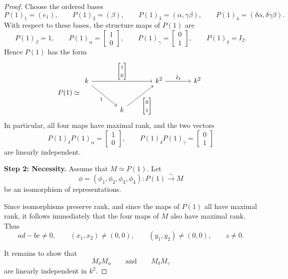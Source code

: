 \documentclass[11pt, a4paper]{article}
\begin{document}
\begin{enumerate}[leftmargin=*, label=\textbf{\arabic*.}]
\begin{proof}
    Choose the ordered bases
    \[
    P(1)_1=(e_1),\qquad
    P(1)_2=(\beta),\qquad
    P(1)_3=(\alpha,\gamma\beta),\qquad
    P(1)_4=(\delta\alpha,\delta\gamma\beta).
    \]
    With respect to these bases, the structure maps of \(P(1)\) are
    \[
    P(1)_\beta=1,\qquad
    P(1)_\alpha=\begin{bmatrix}1\\0\end{bmatrix},\qquad
    P(1)_\gamma=\begin{bmatrix}0\\1\end{bmatrix},\qquad
    P(1)_\delta=I_2.
    \]
    Hence \(P(1)\) has the form
    \[
    P(1)\simeq
    \begin{tikzcd}[ampersand replacement=\&, column sep=large, row sep=large]
    k \arrow[rr, "{\begin{bmatrix}1\\0\end{bmatrix}}"] \arrow[dr, "1"'] \& \& k^2 \arrow[r, "I_2"] \& k^2 \\
    \& k \arrow[ur, "{\begin{bmatrix}0\\1\end{bmatrix}}"'] \&
    \end{tikzcd}
    \]
    In particular, all four maps have maximal rank, and the two vectors
    \[
    P(1)_\delta P(1)_\alpha=\begin{bmatrix}1\\0\end{bmatrix},
    \qquad
    P(1)_\delta P(1)_\gamma=\begin{bmatrix}0\\1\end{bmatrix}
    \]
    are linearly independent.
    
    \medskip
    \noindent\textbf{Step 2: Necessity.}
    Assume that \(M\simeq P(1)\). Let
    \[
    \phi=(\phi_1,\phi_2,\phi_3,\phi_4)\colon P(1)\xrightarrow{\sim} M
    \]
    be an isomorphism of representations.
    
    Since isomorphisms preserve rank, and since the maps of \(P(1)\) all have maximal rank, it follows immediately that the four maps of \(M\) also have maximal rank. Thus
    \[
    ad-bc\neq 0,\qquad
    (x_1,x_2)\neq (0,0),\qquad
    (y_1,y_2)\neq (0,0),\qquad
    z\neq 0.
    \]
    
    It remains to show that
    \[
    M_\delta M_\alpha
    \qquad\text{and}\qquad
    M_\delta M_\gamma
    \]
    are linearly independent in \(k^2\).
    

\end{proof}
\end{enumerate}
\end{document}
